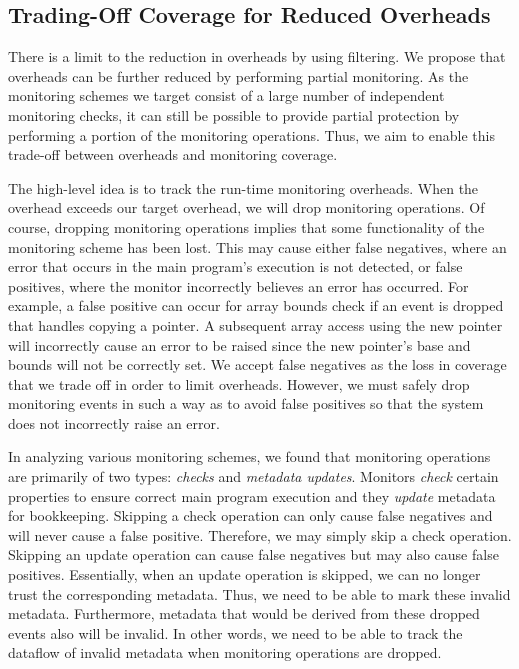 \subsection{Trading-Off Coverage for Reduced Overheads}
\label{sec:optimizations.drop}

There is a limit to the reduction in overheads by using filtering. We propose
that overheads can be further reduced by performing partial monitoring. As the
monitoring schemes we target consist of a large number of independent
monitoring checks, it can still be possible to provide partial protection by
performing a portion of the monitoring operations. Thus, we aim to enable this
trade-off between overheads and monitoring coverage.

The high-level idea is to track the run-time monitoring overheads. When the
overhead exceeds our target overhead, we will drop monitoring operations.  Of
course, dropping monitoring operations implies that some functionality of the
monitoring scheme has been lost.  This may cause either false negatives, where
an error that occurs in the main program's execution is not detected, or false
positives, where the monitor incorrectly believes an error has occurred.  For
example, a false positive can occur for array bounds check if an event is
dropped that handles copying a pointer. A subsequent array access using the new
pointer will incorrectly cause an error to be raised since the new pointer's
base and bounds will not be correctly set.  We accept false negatives as the
loss in coverage that we trade off in order to limit overheads.  However, we
must safely drop monitoring events in such a way as to avoid false positives so
that the system does not incorrectly raise an error.

In analyzing various monitoring schemes, we found that monitoring operations
are primarily of two types: \emph{checks} and \emph{metadata updates}. Monitors
\emph{check} certain properties to ensure correct main program execution and
they \emph{update} metadata for bookkeeping. Skipping a check operation can
only cause false negatives and will never cause a false positive. Therefore, we
may simply skip a check operation. Skipping an update operation can cause false
negatives but may also cause false positives. Essentially, when an update
operation is skipped, we can no longer trust the corresponding metadata. Thus,
we need to be able to mark these invalid metadata. Furthermore, metadata that
would be derived from these dropped events also will be invalid. In other
words, we need to be able to track the dataflow of invalid metadata when
monitoring operations are dropped.
